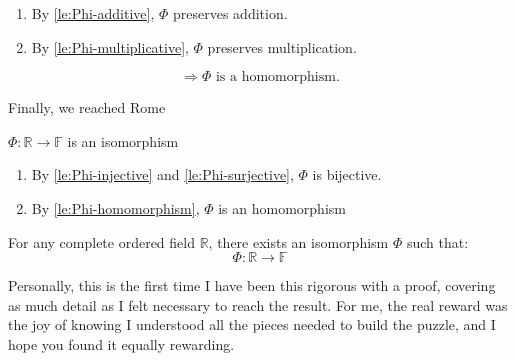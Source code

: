 \begin{bookproof}
\begin{enumerate}
	\item By \cref{le:Phi-additive}, $\Phi$ preserves addition.
	\item By \cref{le:Phi-multiplicative}, $\Phi$ preserves multiplication.
\end{enumerate}
$$\Rightarrow \Phi \text{ is a homomorphism.}$$
\end{bookproof}

Finally, we reached Rome

\begin{lemma}
$\Phi: \mathbb{R} \rightarrow \mathbb{F}$ is an isomorphism
\end{lemma}

\begin{bookproof}
\begin{enumerate}
\item By \cref{le:Phi-injective} and \cref{le:Phi-surjective}, $\Phi$ is bijective.
\item By \cref{le:Phi-homomorphism}, $\Phi$ is an homomorphism
\end{enumerate}
For any complete ordered field $\mathbb{R}$, there exists an isomorphism $\Phi$ such that:
$$\Phi: \mathbb{R} \rightarrow \mathbb{F}$$
\end{bookproof}

Personally, this is the first time I have been this rigorous with a proof, covering as much detail as I felt necessary to reach the result. For me, the real reward was the joy of knowing I understood all the pieces needed to build the puzzle, and I hope you found it equally rewarding.
